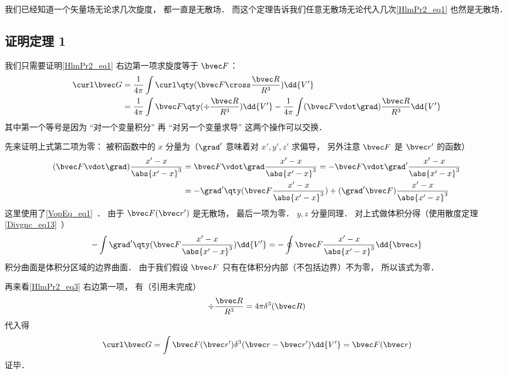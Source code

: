 我们已经知道一个矢量场无论求几次旋度， 都一直是无散场． 而这个定理告诉我们任意无散场无论代入几次\autoref{HlmPr2_eq1} 也然是无散场． 

\subsection{证明定理 1}
我们只需要证明\autoref{HlmPr2_eq1} 右边第一项求旋度等于 $\bvec F$：
\begin{equation}\label{HlmPr2_eq3}
\begin{aligned}
\curl \bvec G &= \frac{1}{4\pi}\int \curl \qty(\bvec F \cross \frac{\bvec R}{R^3}) \dd{V'}\\
&= \frac{1}{4\pi}\int\bvec F \qty(\div \frac{\bvec R}{R^3}) \dd{V'} -  \frac{1}{4\pi}\int(\bvec F \vdot \grad) \frac{\bvec R}{R^3} \dd{V'}
\end{aligned}
\end{equation}
其中第一个等号是因为 “对一个变量积分” 再 “对另一个变量求导” 这两个操作可以交换． %

先来证明上式第二项为零： 被积函数中的 $x$ 分量为（$\grad'$ 意味着对 $x', y', z'$ 求偏导， 另外注意 $\bvec F$ 是 $\bvec r'$ 的函数）
\begin{equation}\label{HlmPr2_eq2}
\begin{aligned}
(\bvec F \vdot \grad) \frac{x' - x}{\abs{x'-x}^3} &= \bvec F \vdot \grad \frac{x' - x}{\abs{x'-x}^3} = -\bvec F \vdot \grad' \frac{x' - x}{\abs{x'-x}^3}\\
&= - \grad'\qty(\bvec F \frac{x' - x}{\abs{x'-x}^3}) + (\grad'\bvec F) \frac{x' - x}{\abs{x'-x}^3}
\end{aligned}
\end{equation}
这里使用了\autoref{VopEq_eq1}~． 由于 $\bvec F(\bvec r')$ 是无散场， 最后一项为零． $y, z$ 分量同理． 对上式做体积分得（使用散度定理\autoref{Divgnc_eq13}~）
\begin{equation}
- \int \grad'\qty(\bvec F \frac{x' - x}{\abs{x'-x}^3})\dd{V'} = -\oint \bvec F \frac{x' - x}{\abs{x'-x}^3} \dd{\bvec s}
\end{equation}
积分曲面是体积分区域的边界曲面． 由于我们假设 $\bvec F$ 只有在体积分内部（不包括边界）不为零， 所以该式为零．

再来看\autoref{HlmPr2_eq3} 右边第一项， 有（引用未完成）
\begin{equation}
\div \frac{\bvec R}{R^3} = 4\pi \delta^3(\bvec R)
\end{equation}
代入得
\begin{equation}
\curl \bvec G = \int \bvec F(\bvec r') \delta^3(\bvec r - \bvec r') \dd{V'} = \bvec F(\bvec r)
\end{equation}
证毕．

